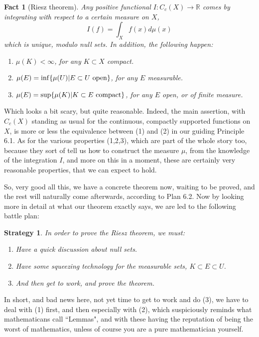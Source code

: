 \documentclass[12pt]{amsbook}
\newtheorem{fact}[theorem]{Fact}
\newtheorem{strategy}[theorem]{Strategy}
\begin{document}
\begin{fact}[Riesz theorem]
Any positive functional $I:C_c(X)\to\mathbb R$ comes by integrating with respect to a certain measure on $X$,
$$I(f)=\int_Xf(x)d\mu(x)$$
which is unique, modulo null sets. In addition, the following happen:
\begin{enumerate}
\item $\mu(K)<\infty$, for any $K\subset X$ compact.

\item $\mu(E)=\inf\{\mu(U)|E\subset U\ {\rm open}\}$, for any $E$ measurable.

\item $\mu(E)=\sup\{\mu(K)|K\subset E\ {\rm compact}\}$, for any $E$ open, or of finite measure.
\end{enumerate}
\end{fact}

Which looks a bit scary, but quite reasonable. Indeed, the main assertion, with $C_c(X)$ standing as usual for the continuous, compactly supported functions on $X$, is more or less the equivalence between (1) and (2) in our guiding Principle 6.1. As for the various properties (1,2,3), which are part of the whole story too, because they sort of tell us how to construct the measure $\mu$, from the knowledge of the integration $I$, and more on this in a moment, these are certainly very reasonable properties, that we can expect to hold.

\bigskip

So, very good all this, we have a concrete theorem now, waiting to be proved, and the rest will naturally come afterwards, according to Plan 6.2. Now by looking more in detail at what our theorem exactly says, we are led to the following battle plan:

\begin{strategy}
In order to prove the Riesz theorem, we must:
\begin{enumerate}
\item Have a quick discussion about null sets.

\item Have some squeezing technology for the measurable sets, $K\subset E\subset U$.

\item And then get to work, and prove the theorem.
\end{enumerate}
\end{strategy}

In short, and bad news here, not yet time to get to work and do (3), we have to deal with (1) first, and then especially with (2), which suspiciously reminds what mathematicans call ``Lemmas", and with these having the reputation of being the worst of mathematics, unless of course you are a pure mathematician yourself.
\end{document}
